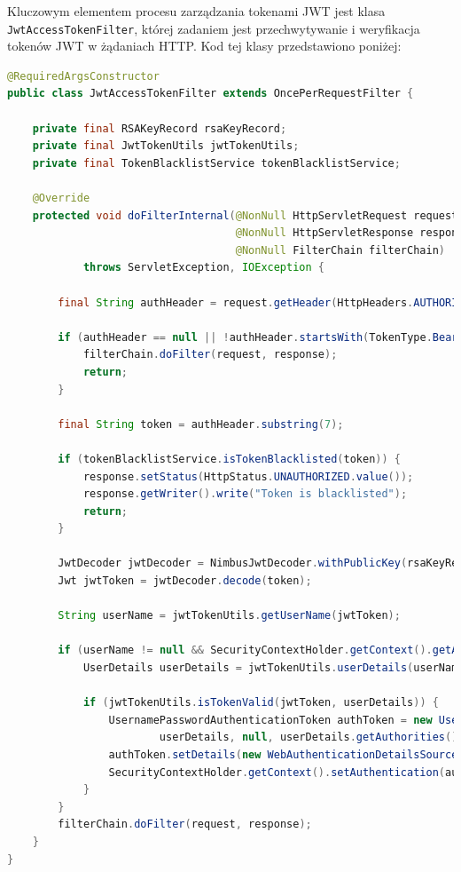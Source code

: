 Kluczowym elementem procesu zarządzania tokenami JWT jest klasa \texttt{JwtAccessTokenFilter}, której zadaniem jest przechwytywanie i weryfikacja tokenów JWT w żądaniach HTTP. Kod tej klasy przedstawiono poniżej:

\begin{lstlisting}[language=Java, caption=Kod niestandardowego filtra \texttt{JwtAccessTokenFilter}]
@RequiredArgsConstructor
public class JwtAccessTokenFilter extends OncePerRequestFilter {

    private final RSAKeyRecord rsaKeyRecord;
    private final JwtTokenUtils jwtTokenUtils;
    private final TokenBlacklistService tokenBlacklistService;

    @Override
    protected void doFilterInternal(@NonNull HttpServletRequest request, 
                                    @NonNull HttpServletResponse response, 
                                    @NonNull FilterChain filterChain) 
            throws ServletException, IOException {

        final String authHeader = request.getHeader(HttpHeaders.AUTHORIZATION);

        if (authHeader == null || !authHeader.startsWith(TokenType.Bearer.name())) {
            filterChain.doFilter(request, response);
            return;
        }

        final String token = authHeader.substring(7);

        if (tokenBlacklistService.isTokenBlacklisted(token)) {
            response.setStatus(HttpStatus.UNAUTHORIZED.value());
            response.getWriter().write("Token is blacklisted");
            return;
        }

        JwtDecoder jwtDecoder = NimbusJwtDecoder.withPublicKey(rsaKeyRecord.publicKey()).build();
        Jwt jwtToken = jwtDecoder.decode(token);

        String userName = jwtTokenUtils.getUserName(jwtToken);

        if (userName != null && SecurityContextHolder.getContext().getAuthentication() == null) {
            UserDetails userDetails = jwtTokenUtils.userDetails(userName);

            if (jwtTokenUtils.isTokenValid(jwtToken, userDetails)) {
                UsernamePasswordAuthenticationToken authToken = new UsernamePasswordAuthenticationToken(
                        userDetails, null, userDetails.getAuthorities());
                authToken.setDetails(new WebAuthenticationDetailsSource().buildDetails(request));
                SecurityContextHolder.getContext().setAuthentication(authToken);
            }
        }
        filterChain.doFilter(request, response);
    }
}
\end{lstlisting}

